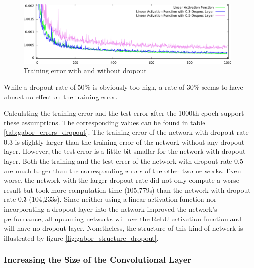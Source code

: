 \documentclass[11pt, a4paper]{article}
\begin{document}
\begin{figure}[h!]
	\centering
	\includegraphics[width=\textwidth]{images/results/gabor_absatan2_linear_dropout05.png}
	\caption{Training error with and without dropout}
	\label{fig:gabor_absatan2_linear_dropout05}
\end{figure}

While a dropout rate of 50\% is obviously too high, a rate of 30\% seems to have almost no effect on the training error.

Calculating the training error and the test error after the 1000th epoch support these assumptions. The corresponding values can be found in table \ref{tab:gabor_errors_dropout}. The training error of the network with dropout rate 0.3 is slightly larger than the training error of the network without any dropout layer. However, the test error is a little bit smaller for the network with dropout layer. Both the training and the test error of the network with dropout rate 0.5 are much larger than the corresponding errors of the other two networks. Even worse, the network with the larger dropout rate did not only compute a worse result but took more computation time (105,779s) than the network with dropout rate 0.3 (104,233s). Since neither using a linear activation function nor incorporating a dropout layer into the network improved the network's performance, all upcoming networks will use the \ac{ReLU} activation function and will have no dropout layer. Nonetheless, the structure of this kind of network is illustrated by figure \ref{fig:gabor_structure_dropout}.
	

\subsubsection{Increasing the Size of the Convolutional Layer}
\end{document}
